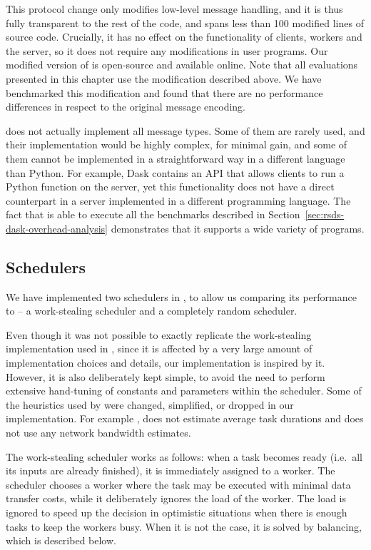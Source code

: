 This protocol change only modifies low-level message handling, and it is thus fully transparent to
the rest of the code, and spans less than 100 modified lines of \dask{} source
code. Crucially, it has no effect on the functionality of clients, workers and the server, so it
does not require any modifications in \dask{} user programs. Our modified
version of \dask{} is open-source and available
online. Note that all evaluations presented in this chapter use the
modification described above. We have benchmarked this modification and found that there are no
performance differences in respect to the original \dask{} message encoding.

\rsds{} does not actually implement all \dask{} message
types. Some of them are rarely used, and their implementation would be highly complex, for minimal
gain, and some of them cannot be implemented in a straightforward way in a different language than
Python. For example, Dask contains an API that allows clients to run a Python function on the
server, yet this functionality does not have a direct counterpart in a server implemented in a
different programming language. The fact that \rsds{} is able to execute all
the benchmarks described in Section~\ref{sec:rsds-dask-overhead-analysis} demonstrates that it supports a
wide variety of \dask{} programs.

\subsection*{Schedulers}
We have implemented two schedulers in \rsds{}, to allow us comparing its
performance to \dask{} -- a work-stealing scheduler and a completely random
scheduler.

Even though it was not possible to exactly replicate the work-stealing implementation used in
\dask{}, since it is affected by a very large amount of implementation choices
and details, our implementation is inspired by it. However, it is also deliberately kept simple, to
avoid the need to perform extensive hand-tuning of constants and parameters within the scheduler.
Some of the heuristics used by \dask{} were changed, simplified, or dropped in
our implementation. For example \rsds{}, does not estimate average task
durations and does not use any network bandwidth estimates.

The \rsds{} work-stealing scheduler works as follows: when a task becomes ready
(i.e.\ all its inputs are already finished), it is immediately assigned to a worker. The scheduler
chooses a worker where the task may be executed with minimal data transfer costs, while it
deliberately ignores the load of the worker. The load is ignored to speed up the decision in
optimistic situations when there is enough tasks to keep the workers busy. When it is not the case,
it is solved by balancing, which is described below.

